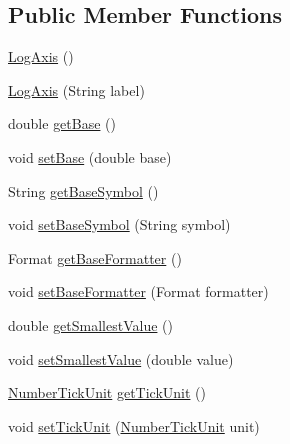 \subsection*{Public Member Functions}
\begin{DoxyCompactItemize}
\item 
\mbox{\hyperlink{classorg_1_1jfree_1_1chart_1_1axis_1_1_log_axis_af75e86e78639fb98a2c7e1c44c100c0c}{Log\+Axis}} ()
\item 
\mbox{\hyperlink{classorg_1_1jfree_1_1chart_1_1axis_1_1_log_axis_a19674eb399be3fa80564fcefd1bb8c5a}{Log\+Axis}} (String label)
\item 
double \mbox{\hyperlink{classorg_1_1jfree_1_1chart_1_1axis_1_1_log_axis_a9d9a84aece9132cbd9620a6aff9d6aef}{get\+Base}} ()
\item 
void \mbox{\hyperlink{classorg_1_1jfree_1_1chart_1_1axis_1_1_log_axis_ae9b951d9b2aba96601386a295ef74184}{set\+Base}} (double base)
\item 
String \mbox{\hyperlink{classorg_1_1jfree_1_1chart_1_1axis_1_1_log_axis_acb1c8149c1ac4cf046ff8088598c2214}{get\+Base\+Symbol}} ()
\item 
void \mbox{\hyperlink{classorg_1_1jfree_1_1chart_1_1axis_1_1_log_axis_ab0f13ef969ce11fbada0e7b9d0d86c16}{set\+Base\+Symbol}} (String symbol)
\item 
Format \mbox{\hyperlink{classorg_1_1jfree_1_1chart_1_1axis_1_1_log_axis_a2d164cf518ea3bddfc0a8589e42173be}{get\+Base\+Formatter}} ()
\item 
void \mbox{\hyperlink{classorg_1_1jfree_1_1chart_1_1axis_1_1_log_axis_ae0d5937e01355a27a1c0b4a0f342e25e}{set\+Base\+Formatter}} (Format formatter)
\item 
double \mbox{\hyperlink{classorg_1_1jfree_1_1chart_1_1axis_1_1_log_axis_a790a3c747f54b4082793c83b4321cd13}{get\+Smallest\+Value}} ()
\item 
void \mbox{\hyperlink{classorg_1_1jfree_1_1chart_1_1axis_1_1_log_axis_a34f8a540ace9cde63733118ccc9d9b48}{set\+Smallest\+Value}} (double value)
\item 
\mbox{\hyperlink{classorg_1_1jfree_1_1chart_1_1axis_1_1_number_tick_unit}{Number\+Tick\+Unit}} \mbox{\hyperlink{classorg_1_1jfree_1_1chart_1_1axis_1_1_log_axis_a25a06c24b1103fea5c074518a283fef2}{get\+Tick\+Unit}} ()
\item 
void \mbox{\hyperlink{classorg_1_1jfree_1_1chart_1_1axis_1_1_log_axis_ac1dd10ceeb8bdc6c1d0631d7fa5f39ad}{set\+Tick\+Unit}} (\mbox{\hyperlink{classorg_1_1jfree_1_1chart_1_1axis_1_1_number_tick_unit}{Number\+Tick\+Unit}} unit)
\item 

\end{DoxyCompactItemize}
